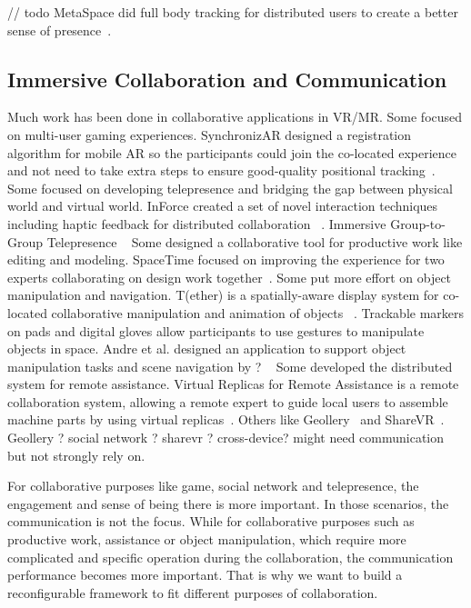 \documentclass{sigchi}
\begin{document}
// todo
MetaSpace did full body tracking for distributed users to create a better sense of presence~\cite{sra2015metaspace}. 

\subsection{Immersive Collaboration and Communication}
Much work has been done in collaborative applications in VR/MR.
Some focused on multi-user gaming experiences. SynchronizAR designed a registration algorithm for mobile AR so the participants could join the co-located experience and not need to take extra steps to ensure good-quality positional tracking~\cite{huo2018synchronizar}.
Some focused on developing telepresence and bridging the gap between physical world and virtual world. InForce created a set of novel interaction techniques including haptic feedback for distributed collaboration ~\cite{nakagaki2019inforce}.
Immersive Group-to-Group Telepresence ~\cite{beck2013immersive}
Some designed a collaborative tool for productive work like editing and modeling. SpaceTime focused on improving the experience for two experts collaborating on design work together~\cite{xia2018spacetime}. 
Some put more effort on object manipulation and navigation.
T(ether) is a spatially-aware display system for co-located collaborative manipulation and animation of objects ~\cite{lakatos2014t}. Trackable markers on pads and digital gloves allow participants to use gestures to manipulate objects in space.
Andre et al. designed an application to support object manipulation tasks and scene navigation by ? ~\cite{kunert2019multi}
Some developed the distributed system for remote assistance.
Virtual Replicas for Remote Assistance is a remote collaboration system, allowing a remote expert to guide local users to assemble machine parts by using virtual replicas~\cite{oda2015virtual}.
Others like Geollery~\cite{du2019geollery} and ShareVR~\cite{gugenheimer2017sharevr}. Geollery ? social network ? sharevr ? cross-device? might need communication but not strongly rely on.

For collaborative purposes like game, social network and telepresence, the engagement and sense of being there is more important. In those scenarios, the communication is not the focus. While for collaborative purposes such as productive work, assistance or object manipulation, which require more complicated and specific operation during the collaboration, the communication performance becomes more important. That is why we want to build a reconfigurable framework to fit different purposes of collaboration.
\end{document}
